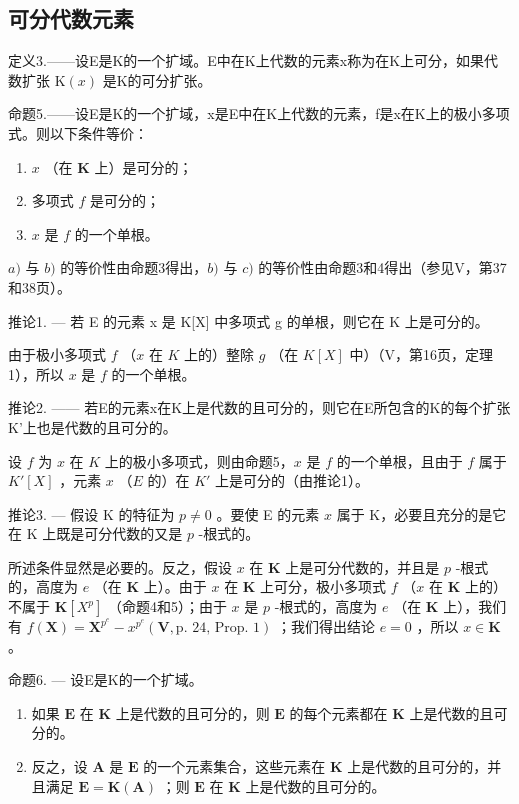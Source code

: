 \subsection{可分代数元素}

定义3.——设E是K的一个扩域。E中在K上代数的元素x称为在K上可分，如果代数扩张 \(\mathrm{K}(x)\) 是K的可分扩张。

命题5.——设E是K的一个扩域，x是E中在K上代数的元素，f是x在K上的极小多项式。则以下条件等价：

\begin{enumerate}
\def\labelenumi{\alph{enumi})}
\item
  \(x\) （在 \(\mathbf{K}\) 上）是可分的；
\item
  多项式 \(f\) 是可分的；
\item
  \(x\) 是 \(f\) 的一个单根。
\end{enumerate}

\(a)\) 与 \(b)\) 的等价性由命题3得出，\(b)\) 与 \(c)\) 的等价性由命题3和4得出（参见V，第37和38页）。

推论1. --- 若 E 的元素 x 是 K{[}X{]} 中多项式 g 的单根，则它在 K 上是可分的。

由于极小多项式 \(f\) （\(x\) 在 \(K\) 上的）整除 \(g\) （在 \(K[X]\) 中）（V，第16页，定理1），所以 \(x\) 是 \(f\) 的一个单根。

推论2. —— 若E的元素x在K上是代数的且可分的，则它在E所包含的K的每个扩张K'上也是代数的且可分的。

设 \(f\) 为 \(x\) 在 \(K\) 上的极小多项式，则由命题5，\(x\) 是 \(f\) 的一个单根，且由于 \(f\) 属于 \(K'[X]\) ，元素 \(x\) （\(E\) 的）在 \(K'\) 上是可分的（由推论1）。

推论3. --- 假设 K 的特征为 \(p \neq 0\) 。要使 E 的元素 \(x\) 属于 K，必要且充分的是它在 K 上既是可分代数的又是 \(p\) -根式的。

所述条件显然是必要的。反之，假设 \(x\) 在 \(\mathbf{K}\) 上是可分代数的，并且是 \(p\) -根式的，高度为 \(e\) （在 \(\mathbf{K}\) 上）。由于 \(x\) 在 \(\mathbf{K}\) 上可分，极小多项式 \(f\) （\(x\) 在 \(\mathbf{K}\) 上的）不属于 \(\mathbf{K}[X^p]\) （命题4和5）；由于 \(x\) 是 \(p\) -根式的，高度为 \(e\) （在 \(\mathbf{K}\) 上），我们有 \(f(\mathbf{X}) = \mathbf{X}^{p^e} - x^{p^e}(\mathbf{V},\text{p. 24, Prop. 1})\) ；我们得出结论 \(e = 0\) ，所以 \(x \in \mathbf{K}\) 。

命题6. --- 设E是K的一个扩域。

\begin{enumerate}
\def\labelenumi{\alph{enumi})}
\item
  如果 \(\mathbf{E}\) 在 \(\mathbf{K}\) 上是代数的且可分的，则 \(\mathbf{E}\) 的每个元素都在 \(\mathbf{K}\) 上是代数的且可分的。
\item
  反之，设 \(\mathbf{A}\) 是 \(\mathbf{E}\) 的一个元素集合，这些元素在 \(\mathbf{K}\) 上是代数的且可分的，并且满足 \(\mathbf{E} = \mathbf{K}(\mathbf{A})\) ；则 \(\mathbf{E}\) 在 \(\mathbf{K}\) 上是代数的且可分的。
\end{enumerate}

